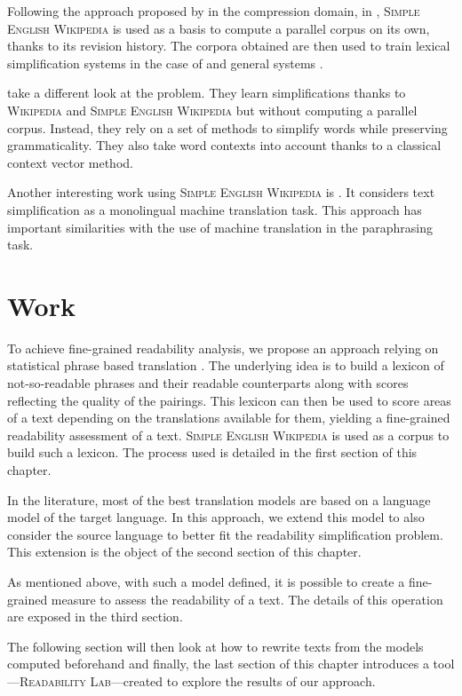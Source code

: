 \documentclass[a4paper, 11pt, onepage]{scrreprt}
\newcommand\wiki{\textsc{Wikipedia}}
\newcommand\sew{\textsc{Simple English Wikipedia}}
\begin{document}
Following the approach proposed by \cite{nelken2008mining} in the
compression domain, in \cite{yatskar2010sake, woodsend2011learning},
\sew{} is used as a basis to compute a parallel corpus on its own,
thanks to its revision history. The corpora obtained are then used to
train lexical simplification systems in the case of
\cite{yatskar2010sake} and general systems
\cite{woodsend2011learning}.

\cite{biran2011putting} take a different look at the problem. They
learn simplifications thanks to \wiki{} and \sew{} but without
computing a parallel corpus. Instead, they rely on a set of methods to
simplify words while preserving grammaticality. They also take word
contexts into account thanks to a classical context vector method.

Another interesting work using \sew{} is \cite{wubben2012sentence}. It
considers text simplification as a monolingual machine translation
task. This approach has important similarities with the use of machine
translation in the paraphrasing task.

\chapter{Work}
\label{cha:work}

To achieve fine-grained readability analysis, we propose an approach
relying on statistical phrase based translation
\cite{koehn2003statistical}. The underlying idea is to build a lexicon
of not-so-readable phrases and their readable counterparts along with
scores reflecting the quality of the pairings. This lexicon can then
be used to score areas of a text depending on the translations
available for them, yielding a fine-grained readability assessment of
a text. \sew{} is used as a corpus to build such a lexicon. The
process used is detailed in the first section of this chapter.

In the literature, most of the best translation models are based on a
language model of the target language. In this approach, we extend
this model to also consider the source language to better fit the
readability simplification problem. This extension is the object of
the second section of this chapter.

As mentioned above, with such a model defined, it is possible to
create a fine-grained measure to assess the readability of a text. The
details of this operation are exposed in the third section.

The following section will then look at how to rewrite texts from the
models computed beforehand and finally, the last section of this
chapter introduces a tool—\textsc{Readability Lab}—created to explore
the results of our approach.
\end{document}
